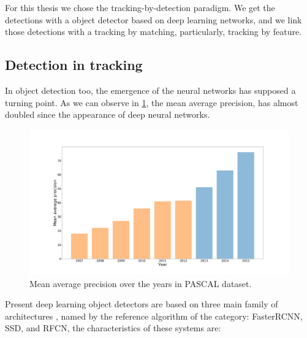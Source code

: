 For this thesis we chose the tracking-by-detection paradigm. We get the detections with a object detector based on deep learning networks, and we link those detections with a tracking by matching, particularly, tracking by feature.

\subsection{Detection in tracking}\label{trackingBounding}


In object detection too, the emergence of the neural networks has supposed a turning point. As we can observe in \ref{deepObjet}, the mean average precision, has almost doubled since the appearance of deep neural networks.


\begin{figure}[H]
\centering         
\includegraphics[width=0.7\linewidth]{intro/objesName.png}
\caption{Mean average precision over the years in PASCAL dataset.} \label{deepObjet}
\end{figure}




Present deep learning object detectors are based on three main family of architectures \cite{cnnComparision}, named by the reference algorithm of the category: FasterRCNN, SSD, and RFCN, the characteristics of these systems are:

%		
%
%



